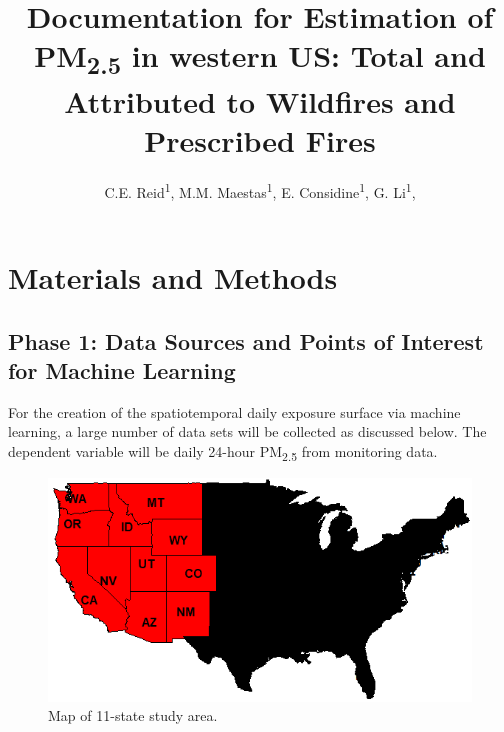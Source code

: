 \documentclass[letterpaper,12pt]{article}
\title{Documentation for Estimation of PM\textsubscript{2.5} in western US: Total and Attributed to Wildfires and Prescribed Fires}
\author{C.E. Reid\textsuperscript{1}, 
M.M. Maestas\textsuperscript{1}, 
E. Considine\textsuperscript{1}, 
G. Li\textsuperscript{1}, \\}
\begin{document}
\selectfont
{}

\maketitle


\tableofcontents

\pagebreak





\section{Materials and Methods}

\subsection{Phase 1: Data Sources and Points of Interest for Machine Learning}
For the creation of the spatiotemporal daily exposure surface via machine learning, a large number of data sets will be collected as discussed below. The dependent variable will be daily 24-hour PM\textsubscript{2.5} from monitoring data.  


\begin{figure}[H] %
\includegraphics[width=1\textwidth]{WesternStatesNoTitleCropped.png} %
\caption{\label{fig:Map11States}Map of 11-state study area.} %
\end{figure} %
\end{document}
